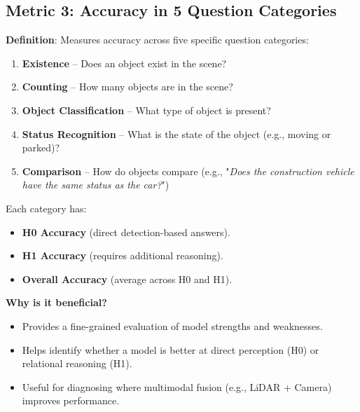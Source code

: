 \documentclass{article} %
\begin{document}
	\subsection{Metric 3: Accuracy in 5 Question Categories}
	\textbf{Definition}: Measures accuracy across five specific question categories:
	\begin{enumerate}
		\item \textbf{Existence} – Does an object exist in the scene?
		\item \textbf{Counting} – How many objects are in the scene?
		\item \textbf{Object Classification} – What type of object is present?
		\item \textbf{Status Recognition} – What is the state of the object (e.g., moving or parked)?
		\item \textbf{Comparison} – How do objects compare (e.g., "\textit{Does the construction vehicle have the same status as the car?}")
	\end{enumerate}
	
	Each category has:
	\begin{itemize}
		\item \textbf{H0 Accuracy} (direct detection-based answers).
		\item \textbf{H1 Accuracy} (requires additional reasoning).
		\item \textbf{Overall Accuracy} (average across H0 and H1).
	\end{itemize}
	
	\textbf{Why is it beneficial?}
	\begin{itemize}
		\item Provides a fine-grained evaluation of model strengths and weaknesses.
		\item Helps identify whether a model is better at direct perception (H0) or relational reasoning (H1).
		\item Useful for diagnosing where multimodal fusion (e.g., LiDAR + Camera) improves performance.
	\end{itemize}
	

	
\end{document}

